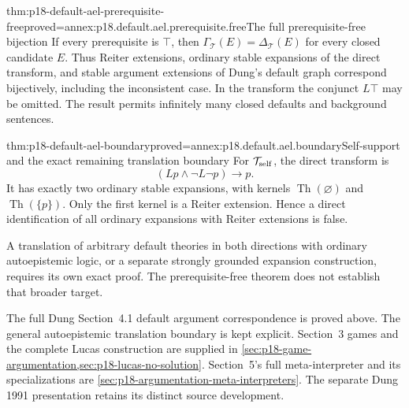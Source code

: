 \begin{hbtheorem}{thm:p18-default-ael-prerequisite-free}{proved=annex:p18.default.ael.prerequisite.free}{The full prerequisite-free bijection}
If every prerequisite is \(\top\), then
\(\Gamma_{\mathcal T}(E)=\Delta_{\mathcal T}(E)\)
for every closed candidate \(E\). Thus
Reiter extensions, ordinary stable expansions
of the direct transform, and stable
argument extensions of Dung's default
graph correspond bijectively, including
the inconsistent case. In the transform
the conjunct \(L\top\) may be omitted.
The result permits infinitely many
closed defaults and background sentences.
\end{hbtheorem}

\begin{hbtheorem}{thm:p18-default-ael-boundary}{proved=annex:p18.default.ael.boundary}{Self-support and the exact remaining translation boundary}
For \(\mathcal T_{\rm self}\), the direct
transform is
\[
                         (Lp\land\neg L\neg p)\to p.
\]
It has exactly two ordinary stable
expansions, with kernels
\(\operatorname{Th}(\varnothing)\) and
\(\operatorname{Th}(\{p\})\).
Only the first kernel is a Reiter
extension. Hence a direct identification
of all ordinary expansions with Reiter
extensions is false.

A translation of arbitrary default
theories in both directions with
ordinary autoepistemic logic, or a
separate strongly grounded expansion
construction, requires its own exact
proof. The prerequisite-free theorem
does not establish that broader target.
\end{hbtheorem}

The full Dung Section~4.1 default argument
correspondence is proved above. The general
autoepistemic translation boundary is
kept explicit. Section~3 games and the complete Lucas construction
are supplied in \cref{sec:p18-game-argumentation,sec:p18-lucas-no-solution}.
Section~5's full meta-interpreter and its specializations are
\cref{sec:p18-argumentation-meta-interpreters}.
The separate Dung 1991 presentation retains its distinct source
development.
